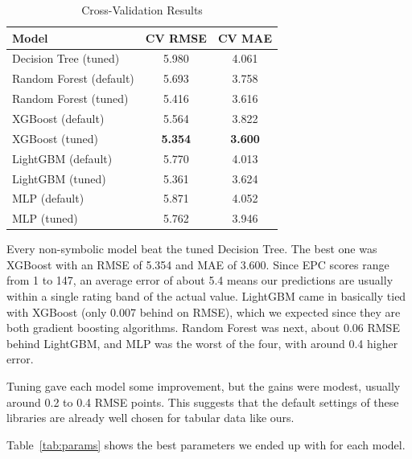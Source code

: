 \documentclass[11pt,a4paper]{article}
\begin{document}
\begin{table}[H]
\centering
\caption{Cross-Validation Results}
\label{tab:results}
\begin{tabular}{lcc}
\toprule
Model                     & CV RMSE          & CV MAE \\
\midrule
Decision Tree (tuned)     & 5.980            & 4.061 \\
\addlinespace
Random Forest (default)   & 5.693            & 3.758 \\
Random Forest (tuned)     & 5.416            & 3.616 \\
XGBoost (default)         & 5.564            & 3.822 \\
XGBoost (tuned)           & \textbf{5.354}   & \textbf{3.600} \\
LightGBM (default)        & 5.770            & 4.013 \\
LightGBM (tuned)          & 5.361            & 3.624 \\
MLP (default)             & 5.871            & 4.052 \\
MLP (tuned)               & 5.762            & 3.946 \\
\bottomrule
\end{tabular}
\end{table}
 
Every non-symbolic model beat the tuned Decision Tree. The best one was XGBoost with an RMSE of 5.354 and MAE of 3.600. Since EPC scores range from 1 to 147, an average error of about 5.4 means our predictions are usually within a single rating band of the actual value. LightGBM came in basically tied with XGBoost (only 0.007 behind on RMSE), which we expected since they are both gradient boosting algorithms. Random Forest was next, about 0.06 RMSE behind LightGBM, and MLP was the worst of the four, with around 0.4 higher error.

Tuning gave each model some improvement, but the gains were modest, usually around 0.2 to 0.4 RMSE points. This suggests that the default settings of these libraries are already well chosen for tabular data like ours.
 
Table~\ref{tab:params} shows the best parameters we ended up with for each model.
 
\end{document}
